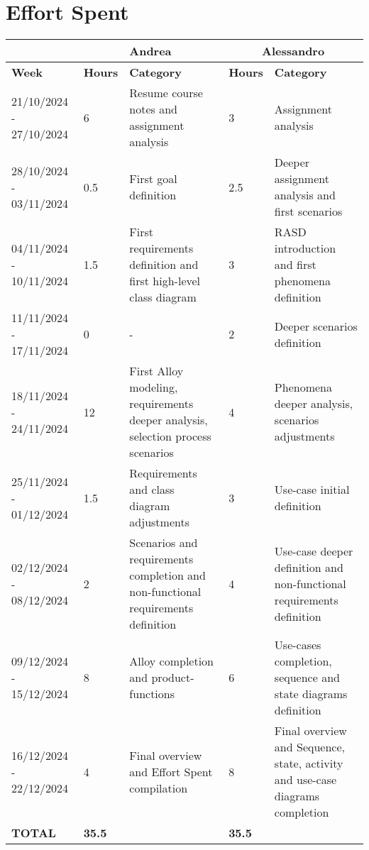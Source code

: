 \chapter{Effort Spent}
	\begin{center}
		\begin{tabular}{ | m{3.2cm} | m{1cm}| m{4cm} | m{1.5cm}| m{4cm} | } 
			\hline
				&  \multicolumn{2}{c|}{ Andrea} & \multicolumn{2}{c|}{ Alessandro} \\ 
			\hline
				\textbf{Week} & \textbf{Hours}   & \textbf{Category} & \textbf{Hours}       & \textbf{Category} \\
			\hline
				21/10/2024 - 27/10/2024 & 6 & Resume course notes and assignment analysis & 3 & Assignment analysis\\
			\hline
				28/10/2024 - 03/11/2024 & 0.5 & First goal definition & 2.5 & Deeper assignment analysis and first scenarios \\
			\hline
				04/11/2024 - 10/11/2024 & 1.5 & First requirements definition and first high-level class diagram & 3 & RASD introduction and first phenomena definition\\
			\hline
				11/11/2024 - 17/11/2024 & 0 & - & 2 & Deeper scenarios definition \\
			\hline
				18/11/2024 - 24/11/2024 & 12 & First Alloy modeling, requirements deeper analysis, selection process scenarios & 4 & Phenomena deeper analysis, scenarios adjustments\\
			\hline
				25/11/2024 - 01/12/2024 & 1.5 & Requirements and class diagram adjustments & 3 & Use-case initial definition \\
			\hline
				02/12/2024 - 08/12/2024 & 2 & Scenarios and requirements completion and non-functional requirements definition & 4 & Use-case deeper definition and non-functional requirements definition\\
			\hline
				09/12/2024 - 15/12/2024 & 8 & Alloy completion and product-functions & 6 & Use-cases completion, sequence and state diagrams definition\\
			\hline
				16/12/2024 - 22/12/2024 & 4 & Final overview and Effort Spent compilation & 8 & Final overview and Sequence, state, activity and use-case diagrams completion \\
			\hline
				\textbf{TOTAL} & \textbf{35.5} & & \textbf{35.5} & \\
			\hline
		\end{tabular}
	\end{center}